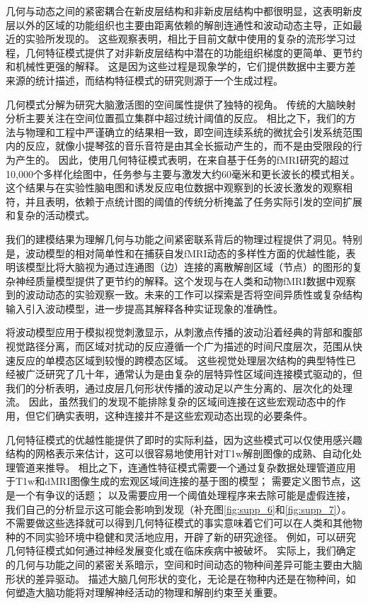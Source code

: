 \documentclass[lang=cn,a4paper,newtx]{elegantpaper}
\begin{document}
几何与动态之间的紧密耦合在新皮层结构和非新皮层结构中都很明显，这表明新皮层以外的区域的功能组织也主要由距离依赖的解剖连通性和波动动态主导，正如最近的实验所发现的。
这些观察表明，相比于目前文献中使用的复杂的流形学习过程，几何特征模式提供了对非新皮层结构中潜在的功能组织梯度的更简单、更节约和机械性更强的解释。
这是因为这些过程是现象学的，它们提供数据中主要方差来源的统计描述，而结构特征模式的研究则源于一个生成过程。


几何模式分解为研究大脑激活图的空间属性提供了独特的视角。
传统的大脑映射分析主要关注在空间位置孤立集群中超过统计阈值的反应。
相比之下，我们的方法与物理和工程中严谨确立的结果相一致，即空间连续系统的微扰会引发系统范围内的反应，就像小提琴弦的音乐音符是由其全长振动产生的，而不是由受限段的行为产生的。
因此，使用几何特征模式表明，在来自基于任务的fMRI研究的超过10,000个多样化绘图中，任务参与主要与激发大约60毫米和更长波长的模式相关。
这个结果与在实验性脑电图和诱发反应电位数据中观察到的长波长激发的观察相符，并且表明，依赖于点统计图的阈值的传统分析掩盖了任务实际引发的空间扩展和复杂的活动模式。


我们的建模结果为理解几何与功能之间紧密联系背后的物理过程提供了洞见。特别是，波动模型的相对简单性和在捕获自发fMRI动态的多样性方面的优越性能，表明该模型比将大脑视为通过连通图（边）连接的离散解剖区域（节点）的图形的复杂神经质量模型提供了更节约的解释。这个发现与在人类和动物fMRI数据中观察到的波动动态的实验观察一致。未来的工作可以探索是否将空间异质性或复杂结构输入引入波动模型，进一步提高其解释各种实证现象的准确性。

将波动模型应用于模拟视觉刺激显示，从刺激点传播的波动沿着经典的背部和腹部视觉路径分离，而区域对扰动的反应遵循一个广为描述的时间尺度层次，范围从快速反应的单模态区域到较慢的跨模态区域。
这些视觉处理层次结构的典型特性已经被广泛研究了几十年，通常认为是由复杂的层特异性区域间连接模式驱动的，但我们的分析表明，通过皮层几何形状传播的波动足以产生分离的、层次化的处理流。
因此，虽然我们的发现不能排除复杂的区域间连接在这些宏观动态中的作用，但它们确实表明，这种连接并不是这些宏观动态出现的必要条件。


几何特征模式的优越性能提供了即时的实际利益，因为这些模式可以仅使用感兴趣结构的网格表示来估计，这可以很容易地使用针对T1w解剖图像的成熟、自动化处理管道来推导。
相比之下，连通性特征模式需要一个通过复杂数据处理管道应用于T1w和dMRI图像生成的宏观区域间连接的基于图的模型；
需要定义图节点，这是一个有争议的话题；
以及需要应用一个阈值处理程序来去除可能是虚假连接，我们自己的分析显示这可能会影响到发现（补充图\ref{fig:supp_6}和\ref{fig:supp_7}）。
不需要做这些选择就可以得到几何特征模式的事实意味着它们可以在人类和其他物种的不同实验环境中稳健和灵活地应用，开辟了新的研究途径。
例如，可以研究几何特征模式如何通过神经发展变化或在临床疾病中被破坏。
实际上，我们确定的几何与功能之间的紧密关系暗示，空间和时间动态的物种间差异可能主要由大脑形状的差异驱动。
描述大脑几何形状的变化，无论是在物种内还是在物种间，如何塑造大脑功能将对理解神经活动的物理和解剖约束至关重要。
\end{document}
